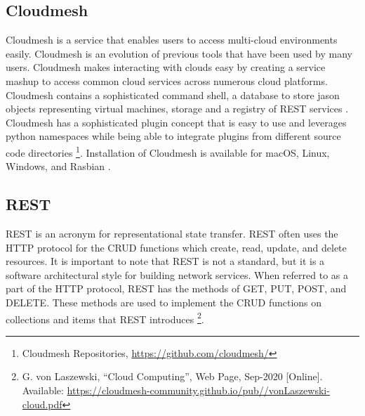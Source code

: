 \subsection{Cloudmesh}\label{cloudmesh}


Cloudmesh \cite{cloudmesh-manual}
is a service that enables users to access multi-cloud environments
easily. Cloudmesh is an evolution of previous tools that have been used
by many users. Cloudmesh makes interacting with clouds easy by creating
a service mashup to access common cloud services across numerous cloud
platforms. Cloudmesh contains a sophisticated command shell, a database
to store jason objects representing virtual machines, storage and a
registry of REST services \cite{cloudmesh-openapi}.
Cloudmesh has
a sophisticated plugin concept that is easy to use and leverages python
namespaces while being able to integrate plugins from different source
code directories \footnote{Cloudmesh Repositories,
  \url{https://github.com/cloudmesh/}}. Installation of Cloudmesh is
available for macOS, Linux, Windows, and Rasbian
\cite{cloudmesh-manual}.


\subsection{REST}\label{rest}

REST is an acronym for representational state transfer. REST often uses
the HTTP protocol for the CRUD functions which create, read, update, and
delete resources. It is important to note that REST is not a standard,
but it is a software architectural style for building network services.
When referred to as a part of the HTTP protocol, REST has the methods of
GET, PUT, POST, and DELETE. These methods are used to implement the CRUD
functions on collections and items that REST introduces \footnote{G. von
  Laszewski, ``Cloud Computing'', Web Page, Sep-2020 {[}Online{]}.
  Available:
  \url{https://cloudmesh-community.github.io/pub//vonLaszewski-cloud.pdf}}.
 
